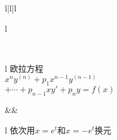 \begin{table}[!htp]
\begin{tblr}{l|l|l}
\begin{tblr}{l}
			\end{tblr}
		\\ \hline
		\begin{tblr}{l}
			欧拉方程 \\ %
			\(x^n y^{(n)} + p_1 x^{n-1} y^{(n-1)}\) \\
			\(+ \dotsb + p_{n-1} x y' + p_n y = f(x)\) \\
		\end{tblr}
			&& \begin{tblr}{l}
				依次用\(x=e^t\)和\(x=-e^t\)换元 \\
			\end{tblr}
		\\ \hline
	\end{tblr}
\end{table}

